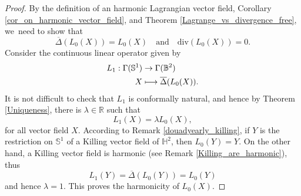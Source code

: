 \documentclass[JEP,XML,SOM,Unicode,NoEqCountersInSection, NoFloatCountersInSection,published]{cedram}
\newcommand\mto{\mathchoice{\longmapsto}{\mapsto}{\mapsto}{\mapsto}}
\theoremstyle{plain}
\theoremstyle{definition}
\begin{document}
\begin{proof}
By the definition of an harmonic Lagrangian vector field, Corollary \ref{cor_on_harmonic_vector_field}, and Theorem \ref{Lagrange_vs_divergence_free}, we~need to show that \begin{equation}
\overline{\Delta}(L_0(X))=L_0(X) \quad\text{and}\quad \mathrm{div}(L_0(X))=0.
\end{equation}
Consider the continuous linear operator given by
\[
\begin{aligned}
L_1:\Gamma(\mathbb{S}^1) & \to \Gamma(\mathbb{B}^2) \\
X & \mto \overline{\Delta}(L_0(X)).
\end{aligned}
\]
It is not difficult to check that $L_1$ is conformally natural, and hence by Theorem \ref{Uniqueness}, there is $\lambda\in\mathbb{R}$ such that
\begin{equation}\label{eq_harmo_L0}
L_1(X)=\lambda L_0(X),
\end{equation} for all vector field $X$.
According to Remark \ref{douadyearly_killing}, if $Y$ is the restriction on $\mathbb{S}^1$ of a Killing vector field of $\mathbb{H}^2$, then $L_0(Y)=Y$. On the other hand, a Killing vector field is harmonic (see Remark \ref{Killing_are_harmonic}), thus
\[
L_1(Y)=\overline{\Delta}(L_0(Y))=L_0(Y)
\]
and hence $\lambda=1$. This proves the harmonicity of $L_0(X)$.


\end{proof}
\end{document}
